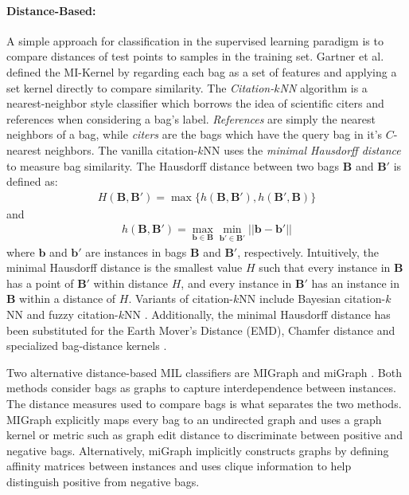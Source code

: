 \paragraph{Distance-Based:}
A simple approach for classification in the supervised learning paradigm is to compare distances of test points to samples in the training set.  Gartner et al. defined the MI-Kernel \citep{Gartner2002MIKernels} by regarding each bag as a set of features and applying a set kernel directly to compare similarity. The \textit{Citation-$k$NN} algorithm \citep{Du2017Thesis,Carbonneau2016MILSurvey,Zhou2003MIEnsemble,Kim2010LocalDRMIL} is a nearest-neighbor style classifier which borrows the idea of scientific citers and references when considering a bag's label.  \textit{References} are simply the nearest neighbors of a bag, while \textit{citers} are the bags which have the query bag in it's $C$-nearest neighbors.  The vanilla citation-$k$NN uses the \textit{minimal Hausdorff distance} to measure bag similarity.  The Hausdorff distance between two bags $\bm{B}$ and $\bm{B}'$ is defined as:
\begin{align}
	H(\bm{B},\bm{B}') = \max \{ h(\bm{B},\bm{B}'),h(\bm{B}',\bm{B}) \}
\end{align}
\noindent
and
\begin{align}
	h(\bm{B},\bm{B}') = \max_{\bm{b}\in \bm{B}} \min_{\bm{b}' \in \bm{B}'}||\bm{b}-\bm{b}' ||
\end{align}
\noindent
where $\bm{b}$ and $\bm{b}'$ are instances in bags $\bm{B}$ and $\bm{B}'$, respectively.  Intuitively, the minimal Hausdorff distance is the smallest value $H$ such that every instance in $\bm{B}$ has a point of $\bm{B}'$ within distance $H$, and every instance in $\bm{B}'$ has an instance in $\bm{B}$ within a distance of $H$. Variants of citation-$k$NN include Bayesian citation-$k$NN and fuzzy citation-$k$NN \citep{Du2017Thesis}.  Additionally, the minimal Hausdorff distance has been substituted for the Earth Mover's Distance (EMD), Chamfer distance and specialized bag-distance kernels \citep{Amores2013MIClassification}.  

Two alternative distance-based MIL classifiers are MIGraph and miGraph \citep{Zhou2009miGraph}.  Both methods consider bags as graphs to capture interdependence between instances. The distance measures used to compare bags is what separates the two methods. MIGraph explicitly maps every bag to an undirected graph and uses a graph kernel or metric such as graph edit distance to discriminate between positive and negative bags.  Alternatively, miGraph implicitly constructs graphs by defining affinity matrices between instances and uses clique information to help distinguish positive from negative bags. 


